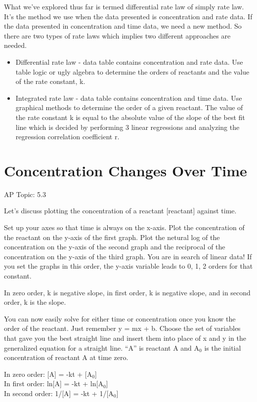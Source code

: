 \documentclass[../chem.tex]{subfiles}
\begin{document}
What we've explored thus far is termed differential rate law of simply rate law. It's the method we use when the data presented is concentration and rate data. 
If the data presented in concentration and time data, we need a new method. So there are two types of rate laws which implies two different approaches are needed.
\begin{itemize}
    \item Differential rate law - data table contains concentration and rate data. Use table logic or ugly algebra to determine the orders of reactants and the value of the rate constant, k.
    \item Integrated rate law - data table contains concentration and time data. Use graphical methods to determine the order of a given reactant. The value of the rate constant k is equal to the absolute value of the slope of the best fit line which is decided by performing 3 linear regressions and analyzing the regression correlation coefficient r. 
\end{itemize}
\section{Concentration Changes Over Time}
AP Topic: 5.3

Let's discuss plotting the concentration of a reactant [reactant] against time.

Set up your axes so that time is always on the x-axis. Plot the concentration of the reactant on the y-axis of the first graph. Plot the netural log of the concentration on the y-axis 
of the second graph and the reciprocal of the concentration on the y-axis of the third graph. You are in search of linear data! If you set the graphs in this order, the y-axis variable leads to 0, 1, 2 orders for that constant.

In zero order, k is negative slope, in first order, k is negative slope, and in second order, k is the slope.

You can now easily solve for either time or concentration once you know the order of the reactant. Just remember y = mx + b. Choose the set of variables 
that gave you the best straight line and insert them into place of x and y in the generalized equation for a straight line. ``A'' is reactant A and A$_0$ is the initial 
concentration of reactant A at time zero.

In zero order: [A] = -kt + [A$_0$]\\
In first order: ln[A] = -kt + ln[A$_0$]\\
In second order: 1/[A] = -kt + 1/[A$_0$]
\end{document}
